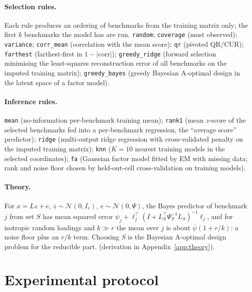 \documentclass{article}
\begin{document}
\paragraph{Selection rules.} Each rule produces an ordering of benchmarks from the training matrix only; the first $k$ benchmarks the model has are run. \texttt{random}; \texttt{coverage} (most observed); \texttt{variance}; \texttt{corr\_mean} (correlation with the mean score); \texttt{qr} (pivoted QR/CUR); \texttt{farthest} (farthest-first in $1-|\mathrm{corr}|$); \texttt{greedy\_ridge} (forward selection minimising the least-squares reconstruction error of all benchmarks on the imputed training matrix); \texttt{greedy\_bayes} (greedy Bayesian A-optimal design in the latent space of a factor model).

\paragraph{Inference rules.} \texttt{mean} (no-information per-benchmark training mean); \texttt{rank1} (mean $z$-score of the selected benchmarks fed into a per-benchmark regression, the ``average score'' predictor); \texttt{ridge} (multi-output ridge regression with cross-validated penalty on the imputed training matrix); \texttt{knn} ($K{=}10$ nearest training models in the selected coordinates); \texttt{fa} (Gaussian factor model fitted by EM with missing data; rank and noise floor chosen by held-out-cell cross-validation on training models).

\paragraph{Theory.} For $x=Lz+e$, $z\sim\mathcal N(0,I_r)$, $e\sim\mathcal N(0,\Psi)$, the Bayes predictor of benchmark $j$ from set $S$ has mean squared error $\psi_j+\ell_j^\top(I+L_S^\top\Psi_S^{-1}L_S)^{-1}\ell_j$, and for isotropic random loadings and $k\gg r$ the mean over $j$ is about $\bar\psi(1+r/k)$: a noise floor plus an $r/k$ term. Choosing $S$ is the Bayesian A-optimal design problem for the reducible part. (derivation in Appendix~\ref{app:theory}).

\section{Experimental protocol}
\label{sec:protocol}
\end{document}
